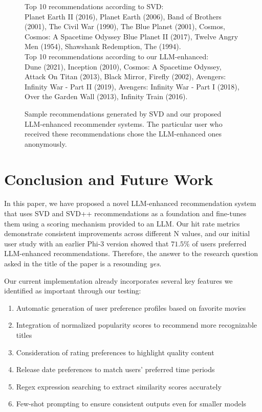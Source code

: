 \documentclass[sigconf]{acmart}
\begin{document}
\begin{figure}
    \begin{mdframed} 
    Top 10 recommendations according to SVD:\\
Planet Earth II (2016), 
Planet Earth (2006), 
Band of Brothers (2001), 
The Civil War (1990), 
The Blue Planet (2001), 
Cosmos, 
Cosmos: A Spacetime Odyssey
Blue Planet II (2017), 
Twelve Angry Men (1954), 
Shawshank Redemption, The (1994). \\

Top 10 recommendations according to our LLM-enhanced:\\
Dune (2021), 
Inception (2010), 
Cosmos: A Spacetime Odyssey, 
Attack On Titan (2013), 
Black Mirror, 
Firefly (2002), 
Avengers: Infinity War - Part II (2019), 
Avengers: Infinity War - Part I (2018), 
Over the Garden Wall (2013), 
Infinity Train (2016). 
\end{mdframed} 
    \caption{Sample recommendations generated by SVD and our proposed LLM-enhanced recommender systems. The particular user who received these recommendations chose the LLM-enhanced ones anonymously.}
    \label{fig:user-prefs}
\end{figure}

\section{Conclusion and Future Work}
In this paper, we have proposed a novel LLM-enhanced recommendation system that uses SVD and SVD++ recommendations as a foundation and fine-tunes them using a scoring mechanism provided to an LLM. Our hit rate metrics demonstrate consistent improvements across different N values, and our initial user study with an earlier Phi-3 version showed that $71.5\%$ of users preferred LLM-enhanced recommendations. Therefore, the answer to the research question asked in the title of the paper is a resounding \textit{yes}.

Our current implementation already incorporates several key features we identified as important through our testing:
\begin{enumerate}
  \item Automatic generation of user preference profiles based on favorite movies
  \item Integration of normalized popularity scores to recommend more recognizable titles
  \item Consideration of rating preferences to highlight quality content
  \item Release date preferences to match users' preferred time periods
  \item Regex expression searching to extract similarity scores accurately
  \item Few-shot prompting to ensure consistent outputs even for smaller models
\end{enumerate}
\end{document}
